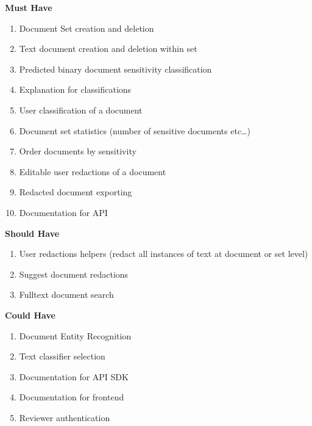 \documentclass[\version]{l4proj}
\begin{document}
\begin{adjustbox}{width=\textwidth,center}
    \begin{minipage}[t]{.5\linewidth}
        \centerline{\textbf{Must Have}}
        \begin{enumerate}[noitemsep,nolistsep,label=\textbf{M\arabic*}]
            \item Document Set creation and deletion
            \item Text document creation and deletion within set
            \item Predicted binary document sensitivity classification
            \item Explanation for classifications
            \item User classification of a document
            \item Document set statistics (number of sensitive documents etc\ldots)
            \item Order documents by sensitivity
            \item Editable user redactions of a document
            \item Redacted document exporting
            \item Documentation for API
        \end{enumerate}
    \end{minipage}
    \hfill
    \noindent
    \begin{minipage}[t]{.5\linewidth}
        \centerline{\textbf{Should Have}}
        \begin{enumerate}[noitemsep,nolistsep,label=\textbf{S\arabic*}]
            \item User redactions helpers (redact all instances of text at document or set level)
            \item Suggest document redactions
            \item Fulltext document search
        \end{enumerate}
        \vspace{0.5cm}
        \centerline{\textbf{Could Have}}
        \begin{enumerate}[noitemsep,nolistsep,label=\textbf{C\arabic*}]
            \item Document Entity Recognition
            \item Text classifier selection
            \item Documentation for API SDK
            \item Documentation for frontend
            \item Reviewer authentication
        \end{enumerate}
    \end{minipage}
\end{adjustbox}
\end{document}

